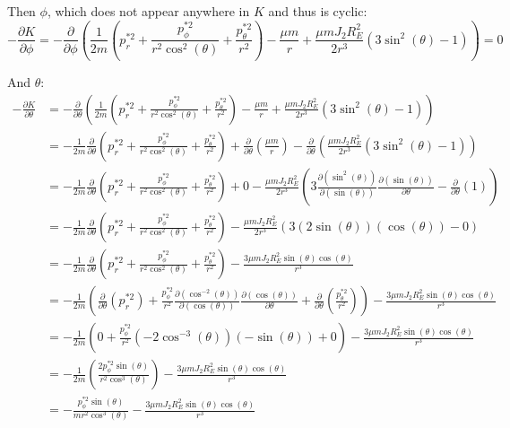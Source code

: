 \documentclass[titlepage]{article}
\begin{document}
Then $\phi$, which does not appear anywhere in $K$ and thus is cyclic:
\begin{equation}
	-\frac{\partial K}{\partial\phi}=-\frac{\partial}{\partial\phi}\left(\frac{1}{2m}\left(p_r^{*2}+\frac{p_\phi^{*2}}{r^2\cos^2(\theta)}+\frac{p_\theta^{*2}}{r^2}\right)-\frac{\mu m}{r}+\frac{\mu mJ_2R_E^2}{2r^3}\left(3\sin^2(\theta)-1\right)\right)=0
\end{equation}

And $\theta$:
\begin{equation}
	\begin{split}
		-\frac{\partial K}{\partial\theta}&=-\frac{\partial}{\partial\theta}\left(\frac{1}{2m}\left(p_r^{*2}+\frac{p_\phi^{*2}}{r^2\cos^2(\theta)}+\frac{p_\theta^{*2}}{r^2}\right)-\frac{\mu m}{r}+\frac{\mu mJ_2R_E^2}{2r^3}\left(3\sin^2(\theta)-1\right)\right) \\
		&=-\frac{1}{2m}\frac{\partial}{\partial\theta}\left(p_r^{*2}+\frac{p_\phi^{*2}}{r^2\cos^2(\theta)}+\frac{p_\theta^{*2}}{r^2}\right)+\frac{\partial}{\partial\theta}\left(\frac{\mu m}{r}\right)-\frac{\partial}{\partial\theta}\left(\frac{\mu mJ_2R_E^2}{2r^3}\left(3\sin^2(\theta)-1\right)\right) \\
		&=-\frac{1}{2m}\frac{\partial}{\partial\theta}\left(p_r^{*2}+\frac{p_\phi^{*2}}{r^2\cos^2(\theta)}+\frac{p_\theta^{*2}}{r^2}\right)+0-\frac{\mu mJ_2R_E^2}{2r^3}\left(3\frac{\partial\left(\sin^2(\theta)\right)}{\partial\left(\sin(\theta)\right)}\frac{\partial\left(\sin(\theta)\right)}{\partial\theta}-\frac{\partial}{\partial\theta}\left(1\right)\right) \\
		&=-\frac{1}{2m}\frac{\partial}{\partial\theta}\left(p_r^{*2}+\frac{p_\phi^{*2}}{r^2\cos^2(\theta)}+\frac{p_\theta^{*2}}{r^2}\right)-\frac{\mu mJ_2R_E^2}{2r^3}\left(3\left(2\sin(\theta)\right)\left(\cos(\theta)\right)-0\right) \\
		&=-\frac{1}{2m}\frac{\partial}{\partial\theta}\left(p_r^{*2}+\frac{p_\phi^{*2}}{r^2\cos^2(\theta)}+\frac{p_\theta^{*2}}{r^2}\right)-\frac{3\mu mJ_2R_E^2\sin(\theta)\cos(\theta)}{r^3} \\
		&=-\frac{1}{2m}\left(\frac{\partial}{\partial\theta}\left(p_r^{*2}\right)+\frac{p_\phi^{*2}}{r^2}\frac{\partial\left(\cos^{-2}(\theta)\right)}{\partial\left(\cos(\theta)\right)}\frac{\partial\left(\cos(\theta)\right)}{\partial\theta}+\frac{\partial}{\partial\theta}\left(\frac{p_\theta^{*2}}{r^2}\right)\right)-\frac{3\mu mJ_2R_E^2\sin(\theta)\cos(\theta)}{r^3} \\
		&=-\frac{1}{2m}\left(0+\frac{p_\phi^{*2}}{r^2}\left(-2\cos^{-3}(\theta)\right)\left(-\sin(\theta)\right)+0\right)-\frac{3\mu mJ_2R_E^2\sin(\theta)\cos(\theta)}{r^3} \\
		&=-\frac{1}{2m}\left(\frac{2p_\phi^{*2}\sin(\theta)}{r^2\cos^3(\theta)}\right)-\frac{3\mu mJ_2R_E^2\sin(\theta)\cos(\theta)}{r^3} \\
		&=-\frac{p_\phi^{*2}\sin(\theta)}{mr^2\cos^3(\theta)}-\frac{3\mu mJ_2R_E^2\sin(\theta)\cos(\theta)}{r^3}
	\end{split}
\end{equation}
\end{document}
